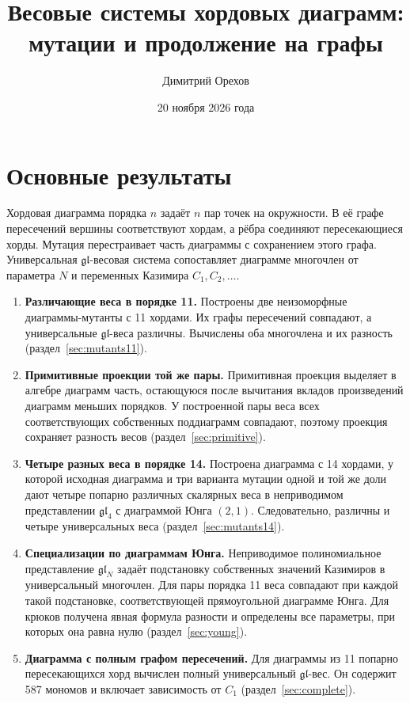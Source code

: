 \documentclass[11pt,a4paper]{article}
\title{Весовые системы хордовых диаграмм: мутации и продолжение на графы}
\author{Димитрий Орехов}
\date{20 ноября 2026 года}
\numberwithin{equation}{section}
\theoremstyle{definition}
\theoremstyle{remark}
\newcommand{\gl}{\mathfrak{gl}}
\begin{document}
\maketitle

\section{Основные результаты}

Хордовая диаграмма порядка $n$ задаёт $n$ пар точек на окружности.
В её графе пересечений вершины соответствуют хордам, а рёбра соединяют
пересекающиеся хорды. Мутация перестраивает часть диаграммы
с сохранением этого графа. Универсальная $\gl$-весовая система
сопоставляет диаграмме многочлен от параметра $N$ и переменных Казимира
$C_1,C_2,\ldots$.

\begin{enumerate}[itemsep=.45em,topsep=.35em]
\item \textbf{Различающие веса в порядке 11.}
Построены две неизоморфные диаграммы-мутанты с 11 хордами. Их графы
пересечений совпадают, а универсальные $\gl$-веса различны.
Вычислены оба многочлена и их разность
(раздел~\ref{sec:mutants11}).

\item \textbf{Примитивные проекции той же пары.}
Примитивная проекция выделяет в алгебре диаграмм часть, остающуюся после
вычитания вкладов произведений диаграмм меньших порядков. У построенной
пары веса всех соответствующих собственных поддиаграмм совпадают,
поэтому проекция сохраняет разность весов
(раздел~\ref{sec:primitive}).

\item \textbf{Четыре разных веса в порядке 14.}
Построена диаграмма с 14 хордами, у которой исходная диаграмма и три
варианта мутации одной и той же доли дают четыре попарно различных
скалярных веса в неприводимом представлении $\gl_4$ с диаграммой Юнга
$(2,1)$. Следовательно, различны и четыре универсальных веса
(раздел~\ref{sec:mutants14}).

\item \textbf{Специализации по диаграммам Юнга.}
Неприводимое полиномиальное представление $\gl_N$ задаёт подстановку
собственных значений Казимиров в универсальный многочлен. Для пары
порядка 11 веса совпадают при каждой такой подстановке, соответствующей
прямоугольной диаграмме Юнга. Для крюков получена явная формула разности
и определены все параметры, при которых она равна нулю
(раздел~\ref{sec:young}).

\item \textbf{Диаграмма с полным графом пересечений.}
Для диаграммы из 11 попарно пересекающихся хорд вычислен полный
универсальный $\gl$-вес. Он содержит 587 мономов и включает зависимость
от $C_1$ (раздел~\ref{sec:complete}).


\end{enumerate}
\end{document}
